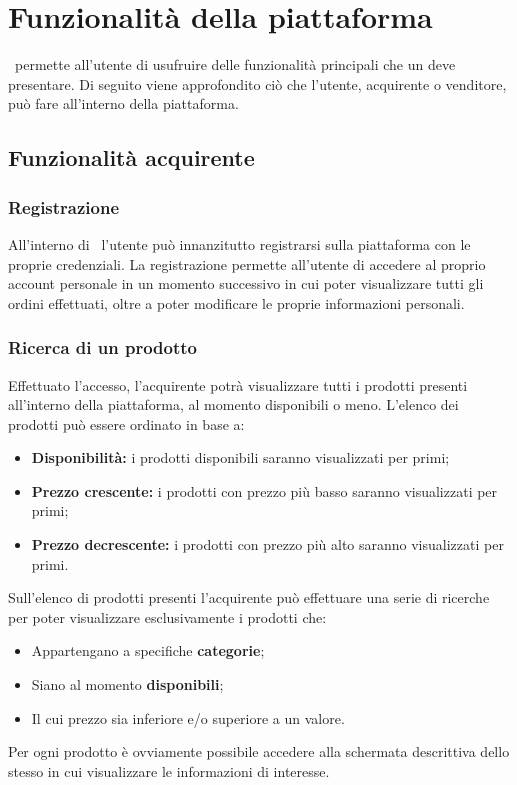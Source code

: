 \section{Funzionalità della piattaforma}
\NomeProgetto\ permette all'utente di usufruire delle funzionalità principali che un  deve presentare. Di seguito viene approfondito ciò che l'utente, acquirente o venditore, può fare all'interno della piattaforma.
\subsection{Funzionalità acquirente}\label{FunzionalitàAcq}
\subsubsection*{Registrazione}
All'interno di \NomeProgetto\ l'utente può innanzitutto registrarsi sulla piattaforma con le proprie credenziali. La registrazione permette all'utente di accedere al proprio account personale in un momento successivo in cui poter visualizzare tutti gli ordini effettuati, oltre a poter modificare le proprie informazioni personali.
\subsubsection*{Ricerca di un prodotto}
Effettuato l'accesso, l'acquirente potrà visualizzare tutti i prodotti presenti all'interno della piattaforma, al momento disponibili o meno. L'elenco dei prodotti può essere ordinato in base a:
\begin{itemize}
	\item \textbf{Disponibilità:} i prodotti disponibili saranno visualizzati per primi;
	\item \textbf{Prezzo crescente:} i prodotti con prezzo più basso saranno visualizzati per primi;
	\item \textbf{Prezzo decrescente:} i prodotti con prezzo più alto saranno visualizzati per primi.
\end{itemize}
Sull'elenco di prodotti presenti l'acquirente può effettuare una serie di ricerche per poter visualizzare esclusivamente i prodotti che:
\begin{itemize}
	\item Appartengano a specifiche \textbf{categorie};
	\item Siano al momento \textbf{disponibili};
	\item Il cui prezzo sia inferiore e/o superiore a un valore.
\end{itemize}
Per ogni prodotto è ovviamente possibile accedere alla schermata descrittiva dello stesso in cui visualizzare le informazioni di interesse.
